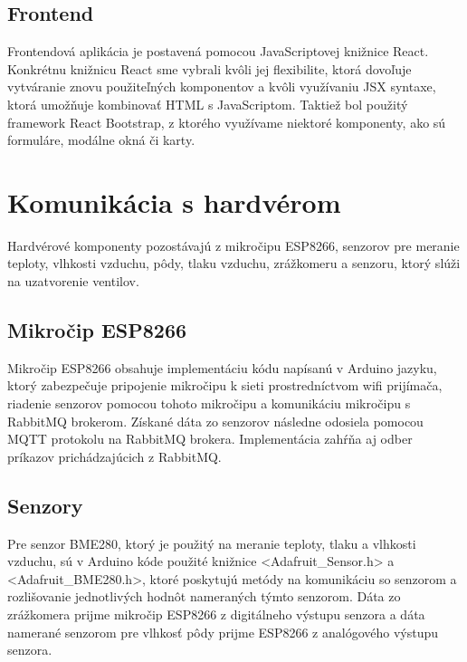 \documentclass[twoside]{ctuthesis}
\theoremstyle{plain}
\theoremstyle{definition}
\theoremstyle{note}
\begin{document}
\subsection{Frontend}
Frontendová aplikácia je postavená pomocou JavaScriptovej knižnice React. Konkrétnu knižnicu React sme vybrali kvôli jej flexibilite, ktorá dovoľuje vytváranie znovu použiteľných komponentov a kvôli využívaniu JSX syntaxe, ktorá umožňuje kombinovať HTML s JavaScriptom. Taktiež bol použitý framework React Bootstrap, z ktorého využívame niektoré komponenty, ako sú formuláre, modálne okná či karty. \cite{react}

\section{Komunikácia s hardvérom}
Hardvérové komponenty pozostávajú z mikročipu ESP8266, senzorov pre meranie teploty, vlhkosti vzduchu, pôdy, tlaku vzduchu, zrážkomeru a senzoru, ktorý slúži na uzatvorenie ventilov.

\subsection{Mikročip ESP8266}
Mikročip ESP8266 obsahuje implementáciu kódu napísanú v Arduino jazyku, ktorý zabezpečuje pripojenie mikročipu k sieti prostredníctvom wifi prijímača, riadenie senzorov pomocou tohoto mikročipu a komunikáciu mikročipu s RabbitMQ brokerom. Získané dáta zo senzorov následne odosiela pomocou MQTT protokolu na RabbitMQ brokera. Implementácia zahŕňa aj odber príkazov prichádzajúcich z RabbitMQ.

\subsection{Senzory}
Pre senzor BME280, ktorý je použitý na meranie teploty, tlaku a vlhkosti vzduchu, sú v Arduino kóde použité knižnice  <Adafruit\_Sensor.h> a  <Adafruit\_BME280.h>, ktoré poskytujú metódy na komunikáciu so senzorom a rozlišovanie jednotlivých hodnôt nameraných týmto senzorom. Dáta zo zrážkomera prijme mikročip ESP8266 z digitálneho výstupu senzora a dáta namerané senzorom pre vlhkosť pôdy prijme ESP8266 z analógového výstupu senzora.
\end{document}

